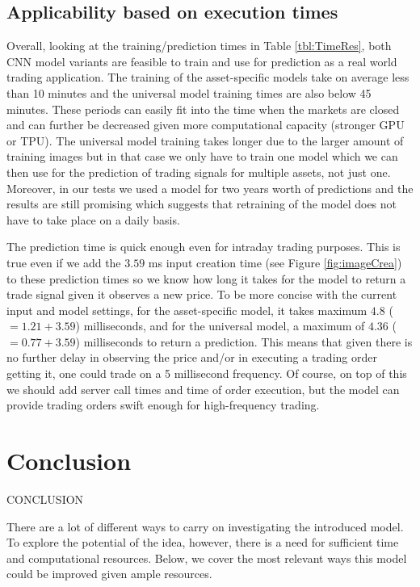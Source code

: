 \documentclass[11pt, a4paper]{article}
\begin{document}
\subsection{Applicability based on execution times}

Overall, looking at the training/prediction times in Table \ref{tbl:TimeRes}, both CNN model variants are feasible to train and use for prediction as a real world trading application. The training of the asset-specific models take on average less than 10 minutes and the universal model training times are also below 45 minutes. These periods can easily fit into the time when the markets are closed and can further be decreased given more computational capacity (stronger GPU or TPU). The universal model training takes longer due to the larger amount of training images but in that case we only have to train one model which we can then use for the prediction of trading signals for multiple assets, not just one.
Moreover, in our tests we used a model for two years worth of predictions and the results are still promising which suggests that retraining of the model does not have to take place on a daily basis. 

The prediction time is quick enough even for intraday trading purposes. This is true even if we add the $3.59$ ms input creation time (see Figure \ref{fig:imageCrea}) to these prediction times so we know how long it takes for the model to return a trade signal given it observes a new price. To be more concise with the current input and model settings, for the asset-specific model, it takes maximum $4.8$ ($=1.21 + 3.59$) milliseconds, and for the universal model, a maximum of $4.36$ ($=0.77 + 3.59$) milliseconds to return a prediction. This means that given there is no further delay in observing the price and/or in executing a trading order getting it, one could trade on a 5 millisecond frequency. Of course, on top of this we should add server call times and time of order execution, but the model can provide trading orders swift enough for high-frequency trading.

\section{Conclusion}
\label{sec:Conclusion}


CONCLUSION

There are a lot of different ways to carry on investigating the introduced model. To explore the potential of the idea, however, there is a need for sufficient time and computational resources. Below, we cover the most relevant ways this model could be improved given ample resources.
\end{document}
